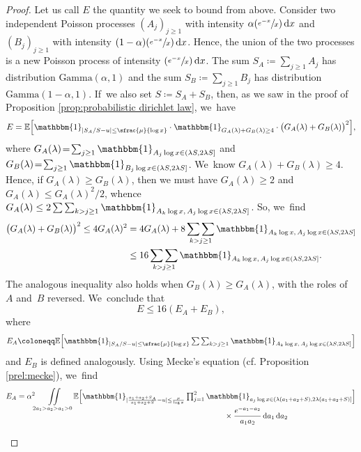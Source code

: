 \documentclass[10pt]{amsart}
\newcommand{\Psfrac}[2]{(\sfrac{#1}{#2})}
\newcommand{\EE}{\mathbb{E}}
\newcommand{\dee}{\,\mathrm{d}}
\newcommand{\one}{\mathbbm{1}}
\newcommand{\bg}{\big}
\newcommand{\bgg}{\Big}
\theoremstyle{plain}
\theoremstyle{definition}
\begin{document}
\begin{proof} Let us call $E$ the quantity we seek to bound from above.
Consider two independent Poisson processes $(A_j)_{j \ge 1}$ with intensity $\alpha\Psfrac{e^{-x}}{x} \dee x$ and $(B_j)_{j \ge 1}$ with intensity $(1-\alpha)\Psfrac{e^{-x}}{x} \dee x$. Hence, the union of the two processes is a new Poisson process of intensity $\Psfrac{e^{-x}}{x}\dee x$.
The sum $S_A \coloneqq \sum_{j\ge1} A_j$ has distribution $\text{Gamma}(\alpha, 1)$ and the sum $S_B \coloneqq \sum_{j\ge1} B_j$ has distribution $\text{Gamma}(1-\alpha, 1)$. If~we also set $S\coloneqq S_A+S_B$, then, as we saw in the proof of Proposition \ref{prop:probabilistic dirichlet law}, we~have
\[
E
=\EE\bgg[ \one_{| S_A/S- u |\le \sfrac{\mu}{\log x} } \cdot \one_{G_A(\lambda)+G_B(\lambda)\ge 4}\cdot \bg( G_A(\lambda)+G_B(\lambda) \bg)^2 \bgg],
\]
where $G_A(\lambda) \!=\! \sum_{j\ge1} \one_{A_j\log x\in(\lambda S,2\lambda S]}$ and $G_B(\lambda)\!=\! \sum_{j\ge1} \one_{B_j\log x\in(\lambda S,2\lambda S]}$. We~know $G_A(\lambda)+G_B(\lambda)\ge4$. Hence, if $G_A(\lambda)\ge G_B(\lambda)$, then we must have \hbox{$G_A(\lambda)\ge 2$} and $G_A(\lambda)\le G_A(\lambda)^2/2$, whence $G_A(\lambda) \le 2\mathop{\sum\sum}_{k>j\ge1} \one_{A_k\log x,\, A_j\log x\in (\lambda S,2\lambda S]}$. So, we~find
\[
\begin{split}
\bg( G_A(\lambda)+G_B(\lambda) \bg)^2 \le 4G_A(\lambda)^2
&= 4 G_A(\lambda) + 8 \mathop{\sum\sum}_{k>j\ge1} \one_{A_k\log x,\, A_j\log x\in (\lambda S,2\lambda S]} \\
&\le 16 \mathop{\sum\sum}_{k>j\ge1} \one_{A_k\log x,\, A_j\log x\in (\lambda S,2\lambda S]}.
\end{split}
\]
The analogous inequality also holds when $G_B(\lambda)\ge G_A(\lambda)$, with the roles of $A$ and~$B$ reversed. We~conclude that
\[
E
\le 16 (E_A+E_B),
\]
where
\[
E_A \coloneqq \EE\bgg[\textstyle \one_{|S_A/S - u |\le \sfrac{\mu}{\log x} } \mathop{\sum\sum}_{k>j\ge1} \one_{A_k\log x,\, A_j\log x\in (\lambda S,2\lambda S]} \bgg]
\]
and $E_B$ is defined analogously. Using Mecke's equation (cf. Proposition \ref{prel:mecke}), we~find
\[
\begin{split}
E_A &= \alpha^2\iint\limits_{2a_1>a_2>a_1>0}
\EE\bgg[\textstyle \one_{| \frac{a_1+a_2+S_A}{a_1+a_2+S} - u |\le \frac{\mu}{\log x} } \prod_{j=1}^2 \one_{a_j\log x \in (\lambda (a_1+a_2+S),2\lambda (a_1+a_2+S)]} \bgg] \\[-10pt]
&\hspace*{9.5cm} \times \frac{e^{-a_1-a_2}}{a_1a_2}\dee a_1\dee a_2 \\[6pt]

\end{split}\]
\end{proof}
\end{document}
